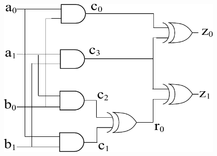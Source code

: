 \documentclass[journal, onecolumn]{IEEEtran}
\begin{document}
\newtheorem{theorem}{Theorem}
\newtheorem{lemma}{Lemma}
\newtheorem{corollary}{Corollary}
\newtheorem{Definition}{Definition}[section]
\newtheorem{Example}{Example}[section]
\newtheorem{Lemma}{Lemma}[section]
\newcommand{\beq}{\begin{equation}}
\newcommand{\eeq}{\end{equation}}
\newcommand{\ov}{\overline}
\newcommand{\xor}{\bigoplus}
\def\tabnote#1{{\small{#1}}}
\def\algorithm{\bgroup\obeylines\obeyspaces\def\ {\quad}
\footnotesize\tt\leftskip=1pc\vskip4pt\relax}
\def\endalgorithm{\vskip4pt\egroup}
\newcommand{\ls}[1]
    {\dimen0=\fontdimen6\the\font
     \lineskip=#1\dimen0
     \advance\lineskip.5\fontdimen5\the\font
     \advance\lineskip-\dimen0
     \lineskiplimit=.9\lineskip
     \baselineskip=\lineskip
     \advance\baselineskip\dimen0
     \normallineskip\lineskip
     \normallineskiplimit\lineskiplimit
     \normalbaselineskip\baselineskip
     \ignorespaces
    }
\def\BibTeX{{\rm B\kern-.05em{\sc i\kern-.025em b}\kern-.08em1
    T\kern-.1667em\lower.7ex\hbox{E}\kern-.125emX}}

\setcounter{page}{1}


\begin{figure}[p]
\centerline{
\includegraphics[scale=0.5]{../figures/2bitmultiplier_gates.pdf}}
\caption{}
\label{fig:mul2bit}
\end{figure}

\clearpage
\end{document}
